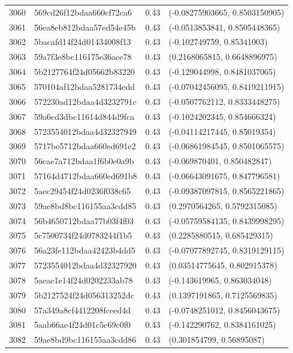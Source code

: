 \begin{table}[ht]
\begin{tabular}{rlrl}
  3060 & 569cd26f12bdaa660cf72ca6 & 0.43 & (-0.08275903665, 0.8503150905) \\ 
  3061 & 56ea8eb812bdaa57ed54e45b & 0.43 & (-0.0513853841, 0.8505448365) \\ 
  3062 & 5bacafd14f24d01434008f13 & 0.43 & (-0.102749759, 0.85341003) \\ 
  3063 & 59a7f3e8bc116175e36ace78 & 0.43 & (0.2168065815, 0.6648896975) \\ 
  3064 & 5b2127764f24d05662b83220 & 0.43 & (-0.129044998, 0.8481037065) \\ 
  3065 & 570104af12bdaa5281734edd & 0.43 & (-0.07042456095, 0.8419211915) \\ 
  3066 & 572230ad12bdaa4d3232791c & 0.43 & (-0.0507762112, 0.8333448275) \\ 
  3067 & 59a6cd3dbc11614d844d9fca & 0.43 & (-0.1024202345, 0.854666324) \\ 
  3068 & 5723554012bdaa4d32327949 & 0.43 & (-0.04114217445, 0.85019354) \\ 
  3069 & 5717be5712bdaa660ed691e2 & 0.43 & (-0.06861984545, 0.8501065575) \\ 
  3070 & 56cae7a712bdaa1f6b0e0a9b & 0.43 & (-0.069870401, 0.850482847) \\ 
  3071 & 57164d4712bdaa660ed691b8 & 0.43 & (-0.06643091675, 0.847796581) \\ 
  3072 & 5aec29454f24d0236f038c65 & 0.43 & (-0.09387097815, 0.8565221865) \\ 
  3073 & 59ae8bd8bc116155aa3cdd85 & 0.43 & (0.2970564265, 0.5792315085) \\ 
  3074 & 56b4650712bdaa77b03f4f03 & 0.43 & (-0.05759584135, 0.8439998295) \\ 
  3075 & 5c7500734f24d0783244f1b5 & 0.43 & (0.2285880515, 0.685429315) \\ 
  3076 & 56a23fe112bdaa42423b4dd5 & 0.43 & (-0.07077892745, 0.8319129115) \\ 
  3077 & 5723554012bdaa4d32327920 & 0.43 & (0.03514775645, 0.802915378) \\ 
  3078 & 5aeae1e14f24d0202233ab78 & 0.43 & (-0.143619965, 0.863034048) \\ 
  3079 & 5b2127524f24d056313252dc & 0.43 & (0.1397191865, 0.7125569835) \\ 
  3080 & 57a349a8cf4412208fceed4d & 0.43 & (-0.0748251012, 0.8456043675) \\ 
  3081 & 5aab66ae4f24d01c5c69c0f0 & 0.43 & (-0.142290762, 0.8384161025) \\ 
  3082 & 59ae8bd9bc116155aa3cdd86 & 0.43 & (0.301854799, 0.56895087) \\ 

\end{tabular}
\end{table}
